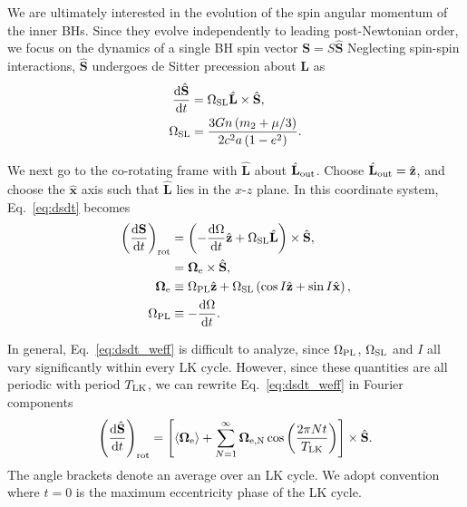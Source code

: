 \documentclass[
        fleqn,
        usenatbib,
    ]{mnras}
\newcommand*{\rd}[2]{\frac{\mathrm{d}#1}{\mathrm{d}#2}}
\newcommand*{\ev}[1]{\langle#1\rangle}
\newcommand*{\bm}[1]{\boldsymbol{\mathbf{#1}}}
\newcommand*{\uv}[1]{\hat{\bm{#1}}}
\newcommand*{\p}[1]{\left(#1\right)}
\newcommand*{\s}[1]{\left[#1\right]}
\begin{document}
We are ultimately interested in the evolution of the spin angular momentum of
the inner BHs. Since they evolve independently to leading post-Newtonian order,
we focus on the dynamics of a single BH spin vector $\bm{S} = S\uv{S}$
Neglecting spin-spin interactions, $\uv{S}$ undergoes de Sitter precession about
$\bm{L}$ as
\begin{align}
    \rd{\hat{\bm{S}}}{t} &= \Omega_{\rm SL}\hat{\bm{L}} \times \hat{\bm{S}}
            \label{eq:dsdt},\\
        \Omega_{\rm SL} &= \frac{3Gn\p{m_2 + \mu/3}}{2c^2a\p{1 - e^2}}.
\end{align}

We next go to the co-rotating frame with $\uv{L}$ about $\uv{L}_{\rm out}$. Choose
$\uv{L}_{\rm out} = \uv{z}$, and choose the $\uv{x}$ axis such that $\uv{L}$
lies in the $x$-$z$ plane. In this coordinate system, Eq.~\eqref{eq:dsdt}
becomes
\begin{align}
    \p{\rd{\bm{S}}{t}}_{\rm rot}
        &= \p{-\rd{\Omega}{t}\uv{z} + \Omega_{\rm SL}\uv{L}} \times \uv{S},\\
        &= \bm{\Omega}_{\rm e} \times \uv{S}\label{eq:dsdt_weff},\\
    \bm{\Omega}_{\rm e} &\equiv \Omega_{\rm PL}\uv{z} + \Omega_{\rm SL}
            \p{\cos I \uv{z} + \sin I \uv{x}},\\
    \Omega_{\rm PL} &\equiv -\rd{\Omega}{t}.
\end{align}

In general, Eq.~\eqref{eq:dsdt_weff} is difficult to analyze, since $\Omega_{\rm
PL}$, $\Omega_{\rm SL}$ and $I$ all vary significantly within every LK cycle.
However, since these quantities are all periodic with period $T_{\rm LK}$, we
can rewrite Eq.~\eqref{eq:dsdt_weff} in Fourier components
\begin{equation}
    \p{\rd{\uv{S}}{t}}_{\rm rot}
        = \s{\ev{\bm{\Omega}_{\rm e}} + \sum\limits_{N = 1}^\infty
            \bm{\Omega}_{\rm e, N}\cos \p{\frac{2\pi N t}{T_{\rm LK}}}}
            \times \uv{S}.\label{eq:dsdt_fullft}
\end{equation}
The angle brackets denote an average over an LK cycle. We adopt convention where
$t = 0$ is the maximum eccentricity phase of the LK cycle.
\end{document}
